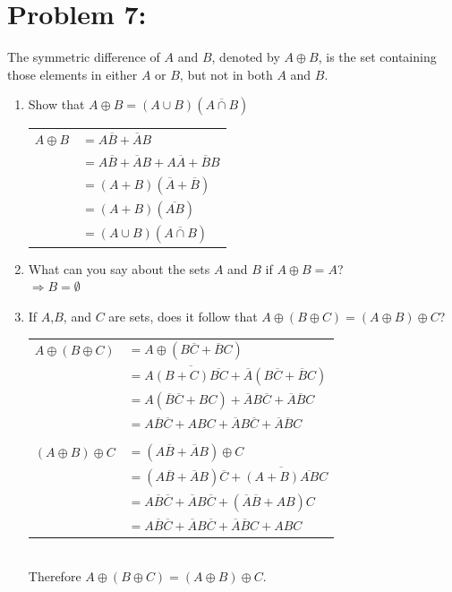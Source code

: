 \documentclass[12pt,en,a4paper]{article}
\begin{document}
	\section*{Problem 7:}
	The symmetric difference of $A$ and $B$, denoted by $A \oplus B$, is the set containing those elements in either $A$ or $B$, but not in both $A$ and $B$.
	\begin{enumerate}
		\item Show that $A \oplus B=(A \cup B)(\overline{A \cap B})$\\
		
		\begin{tabular}{r l}
			$A\oplus B$ & $=A\overline{B}+\overline{A}B$\\
			{} & $=A\overline{B}+\overline{A}B+A\overline{A}+\overline{B}B$\\
			{} & $=(A+B)(\overline{A}+\overline{B})$\\
			{} & $=(A+B)(\overline{AB})$\\
			{} & $=(A\cup B)(\overline{A\cap B})$
		\end{tabular}
		\item What can you say about the sets $A$ and $B$ if $A \oplus B=A$?\\
		$\Rightarrow B=\emptyset$
		\item If $A$,$B$, and $C$ are sets, does it follow that $A \oplus (B \oplus C)=(A \oplus B)\oplus C$?\\
		\begin{tabular}{r l}
			$A\oplus(B\oplus C)$ & $=A\oplus (B\overline{C}+\overline{B}C)$\\
			{} & $=A\overline{(B+C)\overline{BC}}+\overline{A}(B\overline{C}+\overline{B}C)$\\
			{} & $=A(\overline{B}\overline{C}+BC)+\overline{A}B\overline{C}+\overline{A}\overline{B}C$\\
			{} & $=A\overline{B}\overline{C}+ABC+\overline{A}B\overline{C}+\overline{A}\overline{B}C$\\
			{} & {}\\
			$(A\oplus B)\oplus C$ & $=(A\overline{B}+\overline{A}B)\oplus C$\\
			{} & $=(A\overline{B}+\overline{A}B)\overline{C}+\overline{(A+B)\overline{AB}}C$\\
			{} & $=A\overline{B}\overline{C}+\overline{A}B\overline{C}+(\overline{A}\overline{B}+AB)C$\\
			{} & $=A\overline{B}\overline{C}+\overline{A}B\overline{C}+\overline{A}\overline{B}C+ABC$
		\end{tabular}\\
		Therefore $A \oplus (B \oplus C)=(A \oplus B)\oplus C$.
	\end{enumerate}
\newpage
{}
\end{document}
